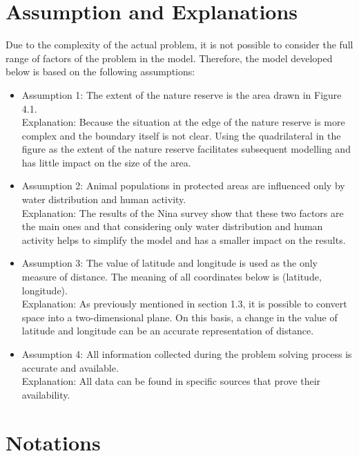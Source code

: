 \documentclass{mcmthesis}
\numberwithin{figure}{section}
\numberwithin{table}{section}
\numberwithin{equation}{section}
\begin{document}
\section{Assumption and Explanations}

Due to the complexity of the actual problem, it is not possible to consider the full range of factors of the problem in the model. Therefore, the model developed below is based on the following assumptions:

\begin{itemize}
	\item Assumption 1: The extent of the nature reserve is the area drawn in Figure 4.1. \\
	Explanation: Because the situation at the edge of the nature reserve is more complex and the boundary itself is not clear. Using the quadrilateral in the figure as the extent of the nature reserve facilitates subsequent modelling and has little impact on the size of the area.
	\item Assumption 2: Animal populations in protected areas are influenced only by water distribution and human activity.
	\\
	Explanation: The results of the Nina survey show that these two factors are the main ones and that considering only water distribution and human activity helps to simplify the model and has a smaller impact on the results.
	\item Assumption 3: The value of latitude and longitude is used as the only measure of distance. The meaning of all coordinates below is (latitude, longitude).
	\\
	Explanation: As previously mentioned in section 1.3, it is possible to convert space into a two-dimensional plane. On this basis, a change in the value of latitude and longitude can be an accurate representation of distance.
	\item Assumption 4: All information collected during the problem solving process is accurate and available.
	\\
	Explanation: All data can be found in specific sources that prove their availability.
\end{itemize}

\section{Notations}
\end{document}
